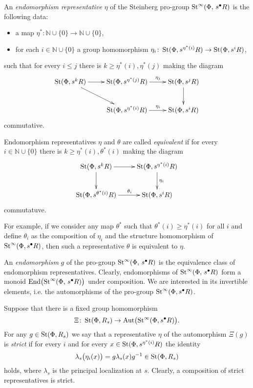 \documentclass[oneside, 11pt]{amsart}
\begin{document}
\begin{df}
An {\it endomorphism representative} $\eta$ of the Steinberg pro-group $\mathop{\mathrm{St}}\nolimits^\infty(\Phi,\,s^\bullet R)$ is the following data: 
\begin{itemize}
\item
a map $\eta^* \colon \mathbb N \cup \{0\} \to \mathbb N \cup \{0\}$,
\item
for each $i \in \mathbb N \cup \{0\}$ a group homomorphism $\eta_i \colon \mathop{\mathrm{St}}\nolimits(\Phi, s^{\eta^*(i)} R) \to \mathop{\mathrm{St}}\nolimits(\Phi, s^i R)$,
\end{itemize}
such that for every $i \leq j$ there is $k \geq \eta^*(i), \eta^*(j)$ making the diagram
$$
\xymatrix{
\St(\Phi, s^k R) \ar[r] \ar[rd] & \St(\Phi, s^{\eta^*(j)} R)\ar[r]^(0.55){\eta_j} & \St(\Phi, s^j R) \ar[d]\\
&\St(\Phi, s^{\eta^*(i)} R) \ar[r]^(0.55){\eta_i} & \St(\Phi, s^i R)
}
$$
commutative.

Endomorphism representatives $\eta$ and $\theta$ are called {\it equivalent} if for every $i \in \mathbb N \cup \{0\}$ there is $k \geq \eta^*(i), \theta^*(i)$ making the diagram
$$
\xymatrix{
\St(\Phi, s^k R)\ar[r]\ar[d] & \St(\Phi, s^{\eta^*(i)} R) \ar[d]^{\eta_i}\\
\St(\Phi, s^{\theta^*(i)} R) \ar[r]^(0.55){\theta_i} & \St(\Phi, s^i R)
}
$$
commutatuve.

For example, if we consider any map $\theta^*$ such that $\theta^*(i) \geq \eta^*(i)$ for all $i$ and define $\theta_i$ as the composition of $\eta_i$ and the structure homomorphism of $\mathop{\mathrm{St}}\nolimits^\infty(\Phi, s^\bullet R)$, then such a representative $\theta$ is equivalent to $\eta$.

An {\it endomorphism} $g$ of the pro-group $\mathop{\mathrm{St}}\nolimits^\infty(\Phi,\,s^\bullet R)$ is the equivalence class of endomorphism representatives. Clearly, endomorphisms of $\mathop{\mathrm{St}}\nolimits^\infty(\Phi,\,s^\bullet R)$ form a monoid $\mathrm{End}\bigl(\mathop{\mathrm{St}}\nolimits^\infty(\Phi,\,s^\bullet R)\bigr)$ under composition. We are interested in its invertible elements, i.e. the automorphisms of the pro-group \(\mathop{\mathrm{St}}\nolimits^\infty(\Phi, s^\bullet R)\).

Suppose that there is a fixed group homomorphism $$\Xi \colon \mathop{\mathrm{St}}\nolimits(\Phi, R_s) \to \mathrm{Aut}\bigl(\mathop{\mathrm{St}}\nolimits^\infty(\Phi, s^\bullet R)\bigr).$$ For any $g \in \mathop{\mathrm{St}}\nolimits(\Phi, R_s)$ we say that a representative $\eta$ of the automorphism $\Xi(g)$ is {\it strict} if for every $i$ and for every $x \in \mathop{\mathrm{St}}\nolimits(\Phi, s^{\eta^*(i)} R)$ the identity
$$
\lambda_s\bigl(\eta_i(x)\bigr) = g \lambda_s(x) g^{-1} \in \mathop{\mathrm{St}}\nolimits(\Phi, R_s)
$$
holds, where $\lambda_s$ is the principal localization at $s$. Clearly, a composition of strict representatives is strict.
\end{df}
\end{document}
